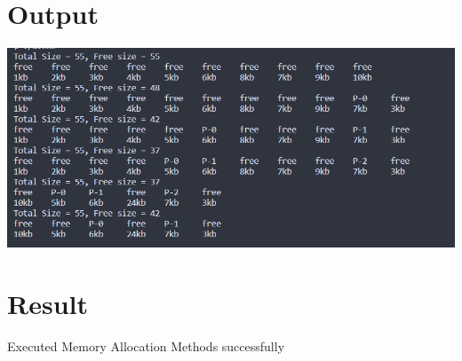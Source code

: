 \section{Output}
\includegraphics[width=\textwidth]{Cycle_3/Outputs/MemoryAlloc.png}

\section{Result}
Executed Memory Allocation Methods successfully